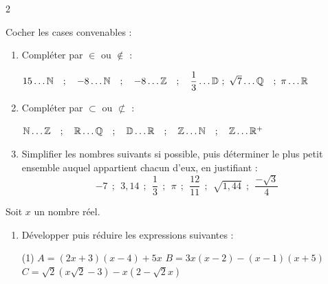 \documentclass[10pt, a4paper]{article}
\begin{document}
\begin{multicols*}{2}

\begin{Activite}[][15 min]
Cocher les cases convenables :
\renewcommand{\arraystretch}{1.5}
\begin{center}
\end{center}
\renewcommand{\arraystretch}{1}
\end{Activite}

\begin{Application}[][20 min]
\begin{enumerate}
    \item Compléter par  $\in$ ou $\notin$ :
    
    $15 \dots \mathbb{N} \quad ; \quad -8 \dots \mathbb{N} \quad ; \quad -8 \dots \mathbb{Z} \quad ; \quad \dfrac{1}{3} \dots \mathbb{D} ~ ; ~ \sqrt{7} \dots \mathbb{Q} \quad ; ~ \pi \dots \mathbb{R}$

    \item Compléter par  $\subset$ ou  $\not\subset$ :
    
    $\mathbb{N} \dots \mathbb{Z} \quad ; \quad \mathbb{R} \dots \mathbb{Q} \quad ; \quad \mathbb{D} \dots \mathbb{R} \quad ; \quad \mathbb{Z} \dots \mathbb{N} \quad ; \quad 
    \mathbb{Z} \dots \mathbb{R}^+    $

\item Simplifier les nombres suivants si possible, puis déterminer le plus petit ensemble auquel appartient chacun d'eux, en justifiant :
$$ -7 ~~;~~ 3{,}14 ~~;~~ \frac{1}{3} ~~;~~ \pi ~~;~~ \frac{12}{11} ~~;~~ \sqrt{1{,}44} ~~;~~ \frac{-\sqrt{3}}{4} $$
\end{enumerate}
\end{Application}

\begin{Application}[][20 min]
Soit $x$ un nombre réel.
\begin{enumerate}
    \item Développer puis réduire les expressions suivantes :
    \begin{tasks}[label=$\bullet$, label-width=5pt, item-indent=15pt](1)
        \task $A = (2x + 3)(x - 4) + 5x$
        \task $B = 3x(x - 2) - (x - 1)(x + 5)$
        \task $C = \sqrt{2}(x\sqrt{2} - 3) - x(2 - \sqrt{2}x)$
    \end{tasks}


\end{enumerate}
\end{Application}
\end{multicols*}
\end{document}
